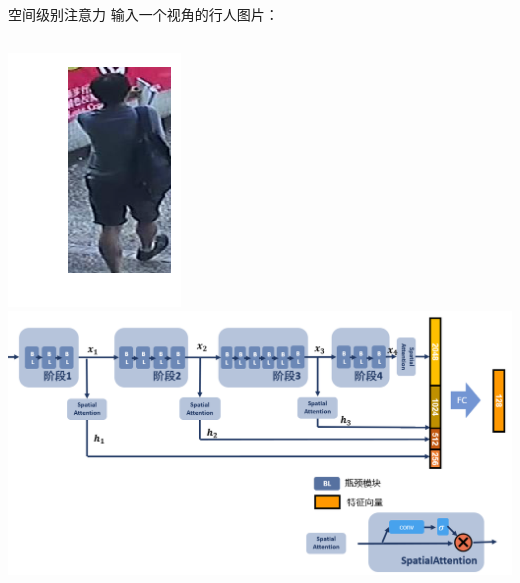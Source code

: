 \documentclass[usenames,dvipsnames,notes]{beamer}
\begin{document}
\begin{frame}{空间级别注意力}
	输入一个视角的行人图片：
	\begin{columns}
		\includegraphics[width=\textwidth]{fig/ori-ped.png}
		\includegraphics[width=\textwidth]{fig/spatial-att.png}
	\end{columns}
\end{frame}
\end{document}
